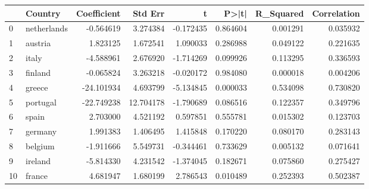 \begin{tabular}{llrrrrrr}
\toprule
 & Country & Coefficient & Std Err & t & P>|t| & R_Squared & Correlation \\
\midrule
0 & netherlands & -0.564619 & 3.274384 & -0.172435 & 0.864604 & 0.001291 & 0.035932 \\
1 & austria & 1.823125 & 1.672541 & 1.090033 & 0.286988 & 0.049122 & 0.221635 \\
2 & italy & -4.588961 & 2.676920 & -1.714269 & 0.099926 & 0.113295 & 0.336593 \\
3 & finland & -0.065824 & 3.263218 & -0.020172 & 0.984080 & 0.000018 & 0.004206 \\
4 & greece & -24.101934 & 4.693799 & -5.134845 & 0.000033 & 0.534098 & 0.730820 \\
5 & portugal & -22.749238 & 12.704178 & -1.790689 & 0.086516 & 0.122357 & 0.349796 \\
6 & spain & 2.703000 & 4.521192 & 0.597851 & 0.555781 & 0.015302 & 0.123703 \\
7 & germany & 1.991383 & 1.406495 & 1.415848 & 0.170220 & 0.080170 & 0.283143 \\
8 & belgium & -1.911666 & 5.549731 & -0.344461 & 0.733629 & 0.005132 & 0.071641 \\
9 & ireland & -5.814330 & 4.231542 & -1.374045 & 0.182671 & 0.075860 & 0.275427 \\
10 & france & 4.681947 & 1.680199 & 2.786543 & 0.010489 & 0.252393 & 0.502387 \\
\bottomrule
\end{tabular}

